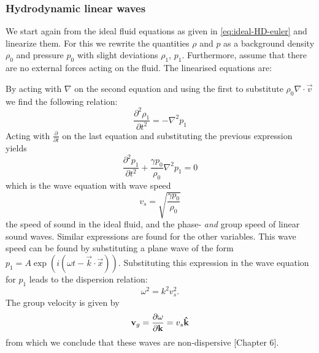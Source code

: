 \subsubsection{Hydrodynamic linear waves}
We start again from the ideal fluid equations as given in \cref{eq:ideal-HD-euler} and linearize them.
For this we rewrite the quantities $\rho$ and $p$ as a background density $\rho_0$ and pressure $p_0$ with slight deviations $\rho_1$, $p_1$.
Furthermore, assume that there are no external forces acting on the fluid. The linearised equations are:

{\centering 
\noindent {}
\par}
By acting with $\nabla$ on the second equation and using the first to substitute $\rho_0 \nabla \cdot \vec{v}$ we find the following relation:
\begin{equation*}
	\frac{\partial^2 \rho_1}{\partial t^2} = -\nabla^2 p_1
\end{equation*}
Acting with $ \frac{\partial}{\partial t}$ on the last equation and substituting the previous expression yields
\begin{equation*}
	\frac{\partial^2 p_1}{\partial t^2} + \frac{\gamma p_0}{\rho_0} \nabla^2 p_1 = 0
\end{equation*}
which is the wave equation with wave speed
\begin{equation}
v_s = \sqrt{ \frac{\gamma p_0}{\rho_0} }
\label{eq:sound-speed}
\end{equation}
the speed of sound in the ideal fluid, and the phase- \textit{and} group speed of linear sound waves.
Similar expressions are found for the other variables. This wave speed can be found by substituting a plane wave of the form $p_1 = A \exp \left( i(\omega t - \vec{k}\cdot\vec{x}) \right) $. Substituting this expression in the wave equation for $p_1$ leads to the dispersion relation:
\begin{equation}
	\omega^2 = k^2v_s^2.
\end{equation}
The group velocity is given by
\begin{equation}
	\mathbf{v}_{g} = \frac{\partial \omega}{\partial \mathbf{k}} = v_s\mathbf{\hat{k}}
	\label{eq:group-velocity}
\end{equation}
from which we conclude that these waves are non-dispersive \cite{notes-fluid-dynamics}[Chapter 6].

